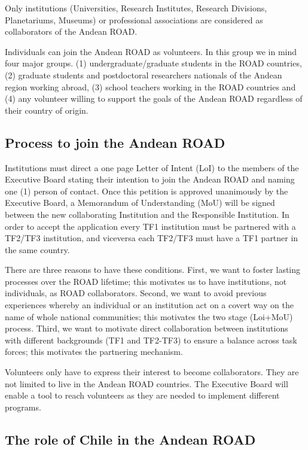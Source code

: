 \documentclass[12pt]{article}
\begin{document}
Only institutions (Universities, Research Institutes, Research
Divisions, Planetariums, Museums) or professional associations are
considered as collaborators of the Andean ROAD. 

Individuals can join the Andean ROAD as volunteers. In this group we
in mind four major groups. (1) undergraduate/graduate students in the
ROAD countries, (2) graduate students and postdoctoral researchers
nationals of the Andean region working abroad, (3) school teachers
working in the ROAD countries and (4) any volunteer willing to support
the goals of the Andean ROAD regardless of their country of origin. 


\subsection*{Process to join the Andean ROAD}

Institutions must direct a one page Letter of Intent (LoI) to the
members of the Executive Board stating their intention to join the
Andean ROAD and naming one (1) person of contact. Once this petition
is approved unanimously by the Executive Board, a Memorandum of
Understanding (MoU) will be signed between the new collaborating Institution
and the Responsible Institution. In order to accept the application
every TF1 institution must be partnered with a TF2/TF3 institution,
and viceversa each TF2/TF3 must have a TF1 partner in the same
country. 

There are three reasons to have these conditions. First, we want to
foster lasting processes over the ROAD lifetime; this motivates us to
have institutions, not individuals, as ROAD collaborators. Second, we want
to avoid previous experiences whereby an individual or an institution
act on a covert way on the name of whole national communities; this
motivates the two stage (Loi+MoU) process. Third, we want to motivate
direct collaboration between institutions with different backgrounds
(TF1 and TF2-TF3) to ensure a balance across task forces; this
motivates the partnering mechanism.  

Volunteers only have to express their interest to become
collaborators. They are not limited to live in the Andean ROAD
countries. The Executive Board will enable a tool to reach volunteers
as they are needed to implement different programs.  

\subsection*{The role of Chile in the Andean ROAD}
\end{document}
